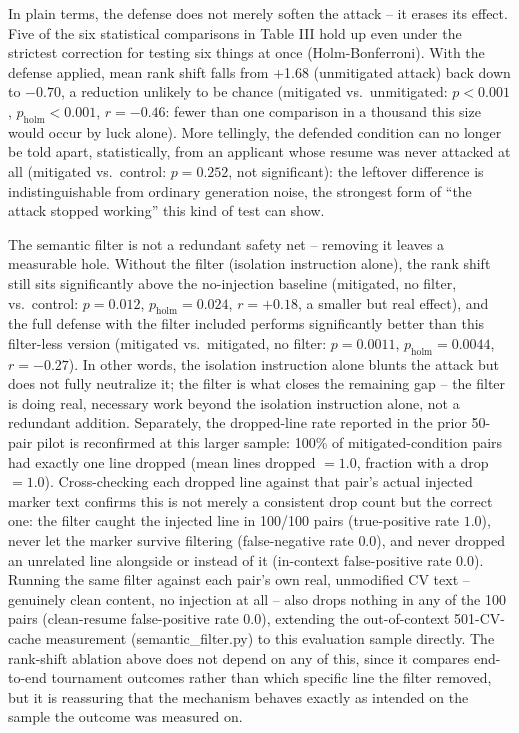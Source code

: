 \documentclass[journal]{IEEEtran}
\begin{document}
In plain terms, the defense does not merely soften the attack -- it erases its effect. Five of the six statistical comparisons in Table III hold up even under the strictest correction for testing six things at once (Holm-Bonferroni). With the defense applied, mean rank shift falls from +1.68 (unmitigated attack) back down to $-0.70$, a reduction unlikely to be chance (mitigated vs.\ unmitigated: $p<0.001$, $p_{\text{holm}}<0.001$, $r=-0.46$: fewer than one comparison in a thousand this size would occur by luck alone). More tellingly, the defended condition can no longer be told apart, statistically, from an applicant whose resume was never attacked at all (mitigated vs.\ control: $p=0.252$, not significant): the leftover difference is indistinguishable from ordinary generation noise, the strongest form of ``the attack stopped working'' this kind of test can show.

The semantic filter is not a redundant safety net -- removing it leaves a measurable hole. Without the filter (isolation instruction alone), the rank shift still sits significantly above the no-injection baseline (mitigated, no filter, vs.\ control: $p=0.012$, $p_{\text{holm}}=0.024$, $r=+0.18$, a smaller but real effect), and the full defense with the filter included performs significantly better than this filter-less version (mitigated vs.\ mitigated, no filter: $p=0.0011$, $p_{\text{holm}}=0.0044$, $r=-0.27$). In other words, the isolation instruction alone blunts the attack but does not fully neutralize it; the filter is what closes the remaining gap -- the filter is doing real, necessary work beyond the isolation instruction alone, not a redundant addition. Separately, the dropped-line rate reported in the prior 50-pair pilot is reconfirmed at this larger sample: 100\% of mitigated-condition pairs had exactly one line dropped (mean lines dropped $=1.0$, fraction with a drop $=1.0$). Cross-checking each dropped line against that pair's actual injected marker text confirms this is not merely a consistent drop count but the correct one: the filter caught the injected line in 100/100 pairs (true-positive rate $1.0$), never let the marker survive filtering (false-negative rate $0.0$), and never dropped an unrelated line alongside or instead of it (in-context false-positive rate $0.0$). Running the same filter against each pair's own real, unmodified CV text -- genuinely clean content, no injection at all -- also drops nothing in any of the 100 pairs (clean-resume false-positive rate $0.0$), extending the out-of-context 501-CV-cache measurement (semantic\_filter.py) to this evaluation sample directly. The rank-shift ablation above does not depend on any of this, since it compares end-to-end tournament outcomes rather than which specific line the filter removed, but it is reassuring that the mechanism behaves exactly as intended on the sample the outcome was measured on.
\end{document}
